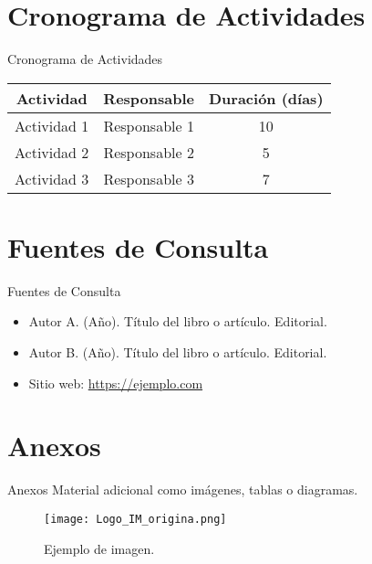 \documentclass{beamer}
\begin{document}
\section{Cronograma de Actividades}
\begin{frame}{Cronograma de Actividades}
    \begin{tabular}{|c|c|c|}
        \hline
        \textbf{Actividad} & \textbf{Responsable} & \textbf{Duración (días)} \\
        \hline
        Actividad 1 & Responsable 1 & 10 \\
        \hline
        Actividad 2 & Responsable 2 & 5 \\
        \hline
        Actividad 3 & Responsable 3 & 7 \\
        \hline
    \end{tabular}
\end{frame}

\section{Fuentes de Consulta}
\begin{frame}{Fuentes de Consulta}
    \begin{itemize}
        \item Autor A. (Año). Título del libro o artículo. Editorial.
        \item Autor B. (Año). Título del libro o artículo. Editorial.
        \item Sitio web: \url{https://ejemplo.com}
    \end{itemize}
\end{frame}

\section{Anexos}
\begin{frame}{Anexos}
    Material adicional como imágenes, tablas o diagramas.
    \begin{figure}[H]
        \centering
        \texttt{[image: Logo\_IM\_origina.png]}
        \caption{Ejemplo de imagen.}
        \label{fig:ejemplo}
    \end{figure}
\end{frame}
\end{document}
